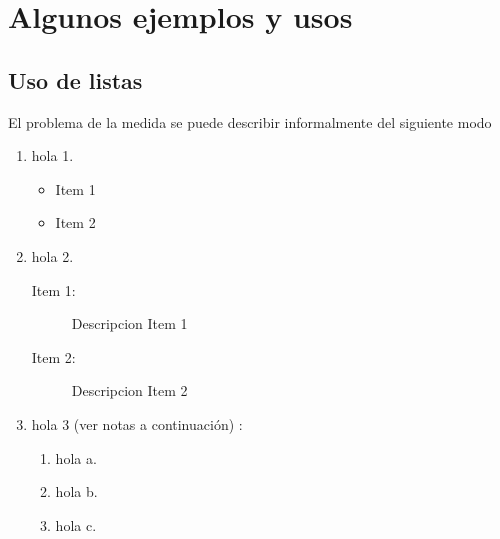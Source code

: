 \chapter{Algunos ejemplos y usos}
\graphicspath{{figs/}}


\label{C:algunos-ejemplos-y-usos}


\section{Uso de listas}
\label{S:uso-de-listas}

El problema de la medida se puede describir informalmente del siguiente modo \cite{Bohr1913PMp10}

\begin{enumerate}
    \item hola 1.
        \begin{itemize}
          \item Item 1
          \item Item 2
        \end{itemize}
    \item hola 2.
        \begin{description}
            \item[Item 1:] Descripcion Item 1
            \item[Item 2:] Descripcion Item 2
        \end{description}
    \item hola 3 (ver notas a continuaci\'{o}n) \cite{Bohm1952PRp166,Bohm1952PRp180}:
        \begin{enumerate}
        \item hola a.
        \item hola b.
        \item hola c.
        \end{enumerate}
        
\end{enumerate}


